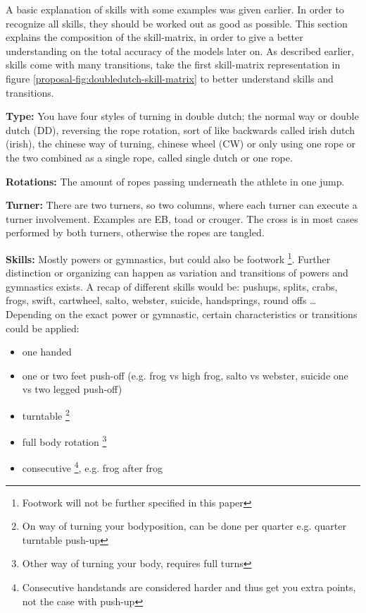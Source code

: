 A basic explanation of skills with some examples was given earlier. In order to recognize all skills, they should be worked out as good as possible. This section explains the composition of the skill-matrix, in order to give a better understanding on the total accuracy of the models later on. As described earlier, skills come with many transitions, take the first skill-matrix representation in figure \ref{proposal-fig:doubledutch-skill-matrix} to better understand skills and transitions.

\textbf{Type:} You have four styles of turning in double dutch; the normal way or double dutch (DD), reversing the rope rotation, sort of like backwards called irish dutch (irish), the chinese way of turning, chinese wheel (CW) or only using one rope or the two combined as a single rope, called single dutch or one rope.

\textbf{Rotations:} The amount of ropes passing underneath the athlete in one jump.

\textbf{Turner:} There are two turners, so two columns, where each turner can execute a turner involvement. Examples are EB, toad or crouger. The cross is in most cases performed by both turners, otherwise the ropes are tangled.

\textbf{Skills:} Mostly powers or gymnastics, but could also be footwork \footnote{Footwork will not be further specified in this paper}. Further distinction or organizing can happen as variation and transitions of powers and gymnastics exists. A recap of different skills would be: pushups, splits, crabs, frogs, swift, cartwheel, salto, webster, suicide, handsprings, round offs \dots %
Depending on the exact power or gymnastic, certain characteristics or transitions could be applied:

\begin{itemize}
    \item one handed
    \item one or two feet push-off (e.g. frog vs high frog, salto vs webster, suicide one vs two legged push-off)
    \item turntable \footnote{On way of turning your bodyposition, can be done per quarter e.g. quarter turntable push-up}
    \item full body rotation \footnote{Other way of turning your body, requires full turns}
    \item consecutive \footnote{Consecutive handstands are considered harder and thus get you extra points, not the case with push-up}, e.g. frog after frog
\end{itemize}

